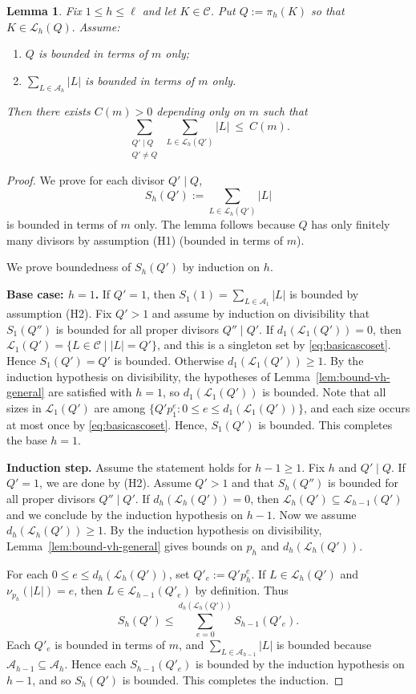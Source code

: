 \documentclass[11pt,reqno]{amsart}
\newtheorem{lemma}[theorem]{Lemma}
\theoremstyle{definition}
\newcommand{\Cset}{\mathcal{C}}
\newcommand{\Aset}{\mathcal{A}}
\newcommand{\Lset}{\mathcal{L}}
\begin{document}
\begin{lemma}\label{lem:proper-divisor-sum-bound}
Fix \(1\le h\le \ell\) and let \(K\in\Cset\).
Put
\(
Q:=\pi_h(K)\) so that \( K\in\Lset_h(Q).\)
Assume:
\begin{enumerate}[label=(H\arabic*)]
\item \(Q\) is bounded in terms of \(m\) only;
\item \(\displaystyle \sum_{L\in\Aset_h}|L|\) is bounded in terms of \(m\) only.
\end{enumerate}
Then there exists \(C(m)>0\) depending only on \(m\) such that
\[ \sum_{\substack{Q'\mid Q\\ Q'\neq Q}}\ \sum_{L\in\Lset_h(Q')} |L|\ \le\ C(m). \]
\end{lemma}

\begin{proof}
We prove for each divisor \(Q'\mid Q\),
\[
S_h(Q'):=\sum_{L\in\Lset_h(Q')} |L|
\]
is bounded in terms of \(m\) only.
The lemma follows because \(Q\) has only finitely many divisors by assumption (H1) (bounded in terms of \(m\)).

We prove boundedness of \(S_h(Q')\) by induction on \(h\).

\smallskip\noindent\textbf{Base case: \(h=1\).}
If \(Q'=1\), then \(S_1(1)=\sum_{L\in\Aset_1}|L|\) is bounded by assumption (H2).
Fix \(Q'>1\) and assume by induction on divisibility that \(S_1(Q'')\) is bounded for all proper divisors \(Q''\mid Q'\).
If \(d_1(\Lset_1(Q'))=0\), then \(\Lset_1(Q') = \{L \in \Cset \mid |L| = Q'\}\), and this is a singleton set by \eqref{eq:basicascoset}. Hence \(S_1(Q') = Q'\) is bounded. Otherwise \(d_1(\Lset_1(Q'))\ge1\). By the induction hypothesis on divisibility, the hypotheses of Lemma~\ref{lem:bound-vh-general} are satisfied with \(h=1\), so \(d_1(\Lset_1(Q'))\) is bounded.
Note that all sizes in \(\Lset_1(Q')\) are among \(\{Q'p_1^e:0\le e\le d_1(\Lset_1(Q'))\}\),
and each size occurs at most once by \eqref{eq:basicascoset}. Hence, \(S_1(Q')\) is bounded. This completes the base \(h=1\).

\smallskip\noindent\textbf{Induction step.}
Assume the statement holds for \(h-1\ge1\).
Fix \(h\) and \(Q'\mid Q\). If \(Q'=1\), we are done by (H2).
Assume \(Q'>1\) and that \(S_h(Q'')\) is bounded for all proper divisors \(Q''\mid Q'\).
If \(d_h(\Lset_h(Q'))=0\), then \(\Lset_h(Q')\subseteq \Lset_{h-1}(Q')\) and we conclude by the induction hypothesis on \(h-1\).
Now we assume \(d_h(\Lset_h(Q'))\ge1\). By the induction hypothesis on divisibility,
Lemma~\ref{lem:bound-vh-general} gives bounds on \(p_h\) and \(d_h(\Lset_h(Q'))\).

For each \(0\le e\le d_h(\Lset_h(Q'))\), set \(Q'_e:=Q'p_h^e\).
If \(L\in\Lset_h(Q')\) and \(\nu_{p_h}(|L|)=e\), then \(L\in\Lset_{h-1}(Q'_e)\) by definition.
Thus
\[
S_h(Q')\le \sum_{e=0}^{d_h(\Lset_h(Q'))} S_{h-1}(Q'_e).
\]
Each \(Q'_e\) is bounded in terms of \(m\), and \(\sum_{L\in\Aset_{h-1}}|L|\) is bounded because \(\Aset_{h-1}\subseteq\Aset_h\).
Hence each \(S_{h-1}(Q'_e)\) is bounded by the induction hypothesis on \(h-1\), and so \(S_h(Q')\) is bounded.
This completes the induction.
\end{proof}
\end{document}
